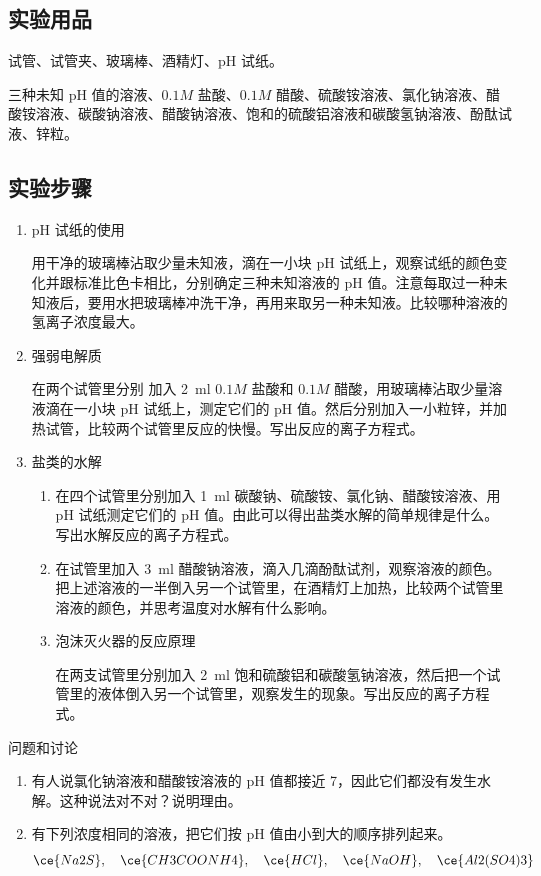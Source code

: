 \subsection*{实验用品}
试管、试管夹、玻璃棒、酒精灯、pH 试纸。

三种未知 pH 值的溶液、$0.1M$ 盐酸、$0.1M$ 醋酸、硫酸铵溶液、氯化钠溶液、醋酸铵溶液、碳酸钠溶液、醋酸钠溶液、饱和的硫酸铝溶液和碳酸氢钠溶液、酚酞试液、锌粒。

\subsection*{实验步骤}
\begin{enumerate}[1.]
  \item pH 试纸的使用
  
  用干净的玻璃棒沾取少量未知液，滴在一小块 pH 试纸上，观察试纸的颜色变化并跟标准比色卡相比，分别确定三种未知溶液的 pH 值。注意每取过一种未知液后，要用水把玻璃棒冲洗干净，再用来取另一种未知液。比较哪种溶液的氢离子浓度最大。
  \item 强弱电解质
  
  在两个试管里分别 加入 \qty{2}{ml} $0.1M$ 盐酸和 $0.1M$ 醋酸，用玻璃棒沾取少量溶液滴在一小块 pH 试纸上，测定它们的 pH 值。然后分别加入一小粒锌，并加热试管，比较两个试管里反应的快慢。写出反应的离子方程式。
  \item 盐类的水解
  \begin{enumerate}[(2)]
    \item 在四个试管里分别加入 \qty{1}{ml} 碳酸钠、硫酸铵、氯化钠、醋酸铵溶液、用 pH 试纸测定它们的 pH 值。由此可以得出盐类水解的简单规律是什么。写出水解反应的离子方程式。
    \item 在试管里加入 \qty{3}{ml} 醋酸钠溶液，滴入几滴酚酞试剂，观察溶液的颜色。把上述溶液的一半倒入另一个试管里，在酒精灯上加热，比较两个试管里溶液的颜色，并思考温度对水解有什么影响。
    \item 泡沫灭火器的反应原理
    
    在两支试管里分别加入 \qty{2}{ml} 饱和硫酸铝和碳酸氢钠溶液，然后把一个试管里的液体倒入另一个试管里，观察发生的现象。写出反应的离子方程式。
  \end{enumerate}
\end{enumerate}
\begin{Theorem}{问题和讨论}
\begin{enumerate}[1.]
  \item 有人说氯化钠溶液和醋酸铵溶液的 pH 值都接近 7，因此它们都没有发生水解。这种说法对不对？说明理由。
  \item 有下列浓度相同的溶液，把它们按 pH 值由小到大的顺序排列起来。
  \[\ce{Na2S},\quad\ce{CH3COONH4},\quad\ce{HCl},\quad\ce{NaOH},\quad\ce{Al2(SO4)3}\]
\end{enumerate}
\end{Theorem}


